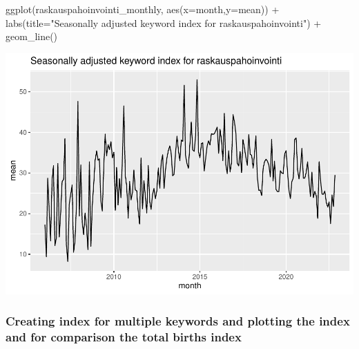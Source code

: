 \documentclass[
]{article}
\newenvironment{Shaded}{\begin{snugshade}}{\end{snugshade}}
\newcommand{\AttributeTok}[1]{\textcolor[rgb]{0.77,0.63,0.00}{#1}}
\newcommand{\FunctionTok}[1]{\textcolor[rgb]{0.00,0.00,0.00}{#1}}
\newcommand{\NormalTok}[1]{#1}
\newcommand{\OtherTok}[1]{\textcolor[rgb]{0.56,0.35,0.01}{#1}}
\newcommand{\SpecialCharTok}[1]{\textcolor[rgb]{0.00,0.00,0.00}{#1}}
\newcommand{\StringTok}[1]{\textcolor[rgb]{0.31,0.60,0.02}{#1}}
\begin{document}
\begin{Shaded}
\begin{Highlighting}[]
\FunctionTok{ggplot}\NormalTok{(raskauspahoinvointi\_monthly, }\FunctionTok{aes}\NormalTok{(}\AttributeTok{x=}\NormalTok{month,}\AttributeTok{y=}\NormalTok{mean)) }\SpecialCharTok{+} \FunctionTok{labs}\NormalTok{(}\AttributeTok{title=}\StringTok{"Seasonally adjusted keyword index for raskauspahoinvointi"}\NormalTok{) }\SpecialCharTok{+} \FunctionTok{geom\_line}\NormalTok{()}
\end{Highlighting}
\end{Shaded}

\includegraphics{GoogleTrendsMarkdown_files/figure-latex/unnamed-chunk-9-4.pdf}

\hypertarget{creating-index-for-multiple-keywords-and-plotting-the-index-and-for-comparison-the-total-births-index}{%
\subsubsection{Creating index for multiple keywords and plotting the
index and for comparison the total births
index}\label{creating-index-for-multiple-keywords-and-plotting-the-index-and-for-comparison-the-total-births-index}}

\begin{Shaded}
\end{Shaded}
\end{document}
